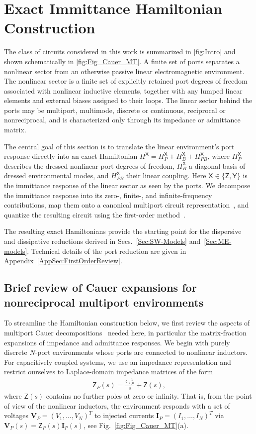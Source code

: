 \documentclass[prx,aps,twocolumn,article]{revtex4-2}
\newcommand{\msf}[1]{\mathsf{#1}}
\newcommand{\bsb}[1]{\boldsymbol{#1}}
\newcommand{\bV}{\bsb{V}\!}
\newcommand{\bI}{\bsb{I}\!}
\newcommand{\msY}{\msf{Y}}
\newcommand{\msZ}{\msf{Z}}
\newcommand{\msC}{\msf{C}}
\newcommand{\msX}{\msf{X}}
\begin{document}
\section{Exact Immittance Hamiltonian Construction}
\label{Sec:ExactH_ZY}

The class of circuits considered in this work is summarized in
\cref{fig:Intro} and shown schematically in \cref{fig:Fig_Cauer_MT}. A finite set of ports separates a nonlinear sector from an otherwise passive linear electromagnetic environment. The nonlinear sector is a finite set of explicitly retained port degrees of freedom associated with nonlinear inductive elements, together with any lumped linear elements and external biases assigned to their loops. The linear sector behind the ports may be multiport, multimode, discrete or continuous, reciprocal or nonreciprocal, and is characterized only through its impedance or admittance matrix.

The central goal of this section is to translate the linear environment's port response directly into an exact Hamiltonian
$H^{\msX}=H_P^{\msX}+H_B^{\msX}+H_{PB}^{\msX}$, where $H_P^{\msX}$ describes the dressed nonlinear port degrees of freedom, $H_B^{\msX}$ a diagonal basis of dressed environmental modes, and $H_{PB}^{\msX}$ their linear coupling. Here $\msX\in\{\msZ,\msY\}$ is the immittance response of the linear sector as seen by the ports. We decompose the immittance response into its zero-, finite-, and infinite-frequency contributions, map them onto a canonical multiport circuit representation~\cite{Newcomb:1966}, and quantize the resulting circuit using the first-order method~\cite{ParraRodriguez:2024,ParraRodriguez:2025}.

The resulting exact Hamiltonians provide the starting point for the dispersive and dissipative reductions derived in Secs.~\ref{Sec:SW-Models} and~\ref{Sec:ME-models}. Technical details of the port reduction are given in Appendix~\ref{AppSec:FirstOrderReview}.


\subsection{Brief review of Cauer expansions for nonreciprocal multiport environments}

To streamline the Hamiltonian construction below, we first review the aspects of multiport Cauer decompositions~\cite{Newcomb:1966} needed here, in particular the matrix-fraction expansions of impedance and admittance responses. We begin with purely discrete $N$-port environments whose ports are connected to nonlinear inductors. For capacitively coupled systems, we use an impedance representation and restrict ourselves to Laplace-domain impedance matrices of the form
\begin{align}
    \msZ_P(s) = \frac{\msC_{\msZ,0}^{-1}}{s}+\msZ(s),
    \label{eq:Z_P_class}
\end{align}
where $\msZ(s)$ contains no further poles at zero or infinity. That is, from the point of view of the nonlinear inductors, the environment responds with a set of voltages $\bV_P=(V_1,\dots, V_N)^T$ to injected currents $\bI_P=(I_1,\dots, I_N)^T$ via $\bV_P(s)=\msZ_P(s)\bI_P(s)$, see Fig.~\ref{fig:Fig_Cauer_MT}(a).
\end{document}
